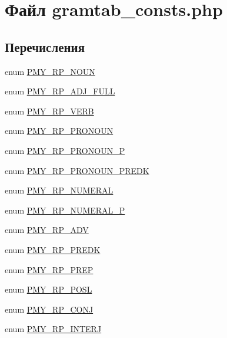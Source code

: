 \hypertarget{gramtab__consts_8php}{
\section{Файл gramtab\_\-consts.php}
\label{gramtab__consts_8php}
}
\subsection*{Перечисления}
\begin{DoxyCompactItemize}
\item 
enum \hyperlink{gramtab__consts_8php_a0f96532b3fb9fa2bd96492b44884678a}{PMY\_\-RP\_\-NOUN} 
\item 
enum \hyperlink{gramtab__consts_8php_a3a376e4e800fae0eb1ddb336697069a4}{PMY\_\-RP\_\-ADJ\_\-FULL} 
\item 
enum \hyperlink{gramtab__consts_8php_ac57753014fd4284b52da74125f7d1b53}{PMY\_\-RP\_\-VERB} 
\item 
enum \hyperlink{gramtab__consts_8php_a8c180567deb43e9007d83e35c9618ccc}{PMY\_\-RP\_\-PRONOUN} 
\item 
enum \hyperlink{gramtab__consts_8php_a2ff359f105ff24b3c4033c94c27ab2ec}{PMY\_\-RP\_\-PRONOUN\_\-P} 
\item 
enum \hyperlink{gramtab__consts_8php_ac2b9227e63895c50da891003d8f0917b}{PMY\_\-RP\_\-PRONOUN\_\-PREDK} 
\item 
enum \hyperlink{gramtab__consts_8php_a6e7a70a35ae2f6e59ca10ea97a0e1a6b}{PMY\_\-RP\_\-NUMERAL} 
\item 
enum \hyperlink{gramtab__consts_8php_a1716b26442db34cfc82e75fea0b9fc55}{PMY\_\-RP\_\-NUMERAL\_\-P} 
\item 
enum \hyperlink{gramtab__consts_8php_ad8d39bce5af22cc34f6f220b1dc13db7}{PMY\_\-RP\_\-ADV} 
\item 
enum \hyperlink{gramtab__consts_8php_ab5e1a302f170f3fddcab9344e491fd8a}{PMY\_\-RP\_\-PREDK} 
\item 
enum \hyperlink{gramtab__consts_8php_ac7e56ddcbdd39c023daed3761fa1a395}{PMY\_\-RP\_\-PREP} 
\item 
enum \hyperlink{gramtab__consts_8php_a538ae407c03fa0c51bed481ac7b4f545}{PMY\_\-RP\_\-POSL} 
\item 
enum \hyperlink{gramtab__consts_8php_ace27c561d191a6374c3c29f08988e928}{PMY\_\-RP\_\-CONJ} 
\item 
enum \hyperlink{gramtab__consts_8php_a005ccfb0d5681d882bf7bc17aa9a2677}{PMY\_\-RP\_\-INTERJ} 
\item 

\end{DoxyCompactItemize}
